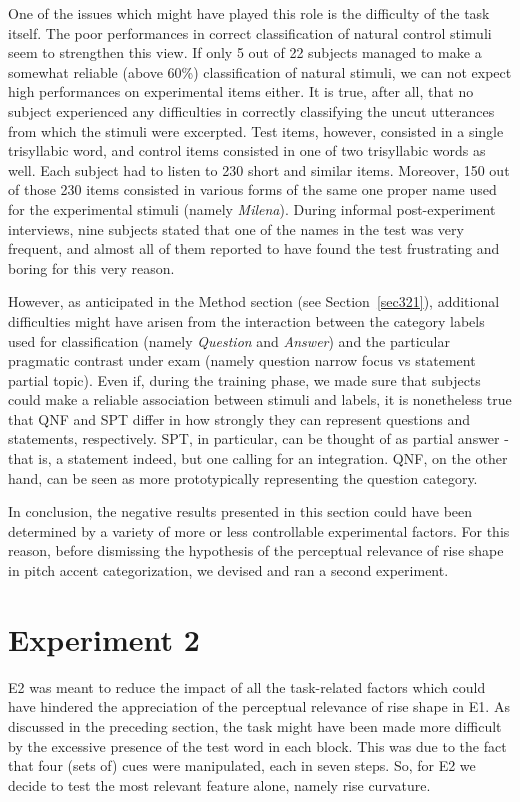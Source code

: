 One of the issues which might have played this role is the difficulty of the task itself. The poor performances in correct classification of natural control stimuli seem to strengthen this view. If only 5 out of 22 subjects managed to make a somewhat reliable (above 60\%) classification of natural stimuli, we can not expect high performances on experimental items either. It is true, after all, that no subject experienced any difficulties in correctly classifying the uncut utterances from which the stimuli were excerpted. Test items, however, consisted in a single trisyllabic word, and control items consisted in one of two trisyllabic words as well. Each subject had to listen to 230 short and similar items. Moreover, 150 out of those 230 items consisted in various forms of the same one proper name used for the experimental stimuli (namely \textit{Milena}). During informal post-experiment interviews, nine subjects stated that one of the names in the test was very frequent, and almost all of them reported to have found the test frustrating and boring for this very reason.

However, as anticipated in the Method section (see Section~\ref{sec321}), additional difficulties might have arisen from the interaction between the category labels used for classification (namely \textit{Question} and \textit{Answer}) and the particular pragmatic contrast under exam (namely question narrow focus vs statement partial topic). Even if, during the training phase, we made sure that subjects could make a reliable association between stimuli and labels, it is nonetheless true that QNF and SPT differ in how strongly they can represent questions and statements, respectively. SPT, in particular, can be thought of as partial answer - that is, a statement indeed, but one calling for an integration. QNF, on the other hand, can be seen as more prototypically representing the question category.

In conclusion, the negative results presented in this section could have been determined by a variety of more or less controllable experimental factors. For this reason, before dismissing the hypothesis of the perceptual relevance of rise shape in pitch accent categorization, we devised and ran a second experiment.

\section{Experiment 2}\label{sec33}
E2 was meant to reduce the impact of all the task-related factors which could have hindered the appreciation of the perceptual relevance of rise shape in E1. As discussed in the preceding section, the task might have been made more difficult by the excessive presence of the test word in each block. This was due to the fact that four (sets of) cues were manipulated, each in seven steps. So, for E2 we decide to test the most relevant feature alone, namely rise curvature.

